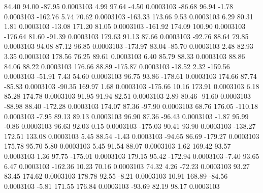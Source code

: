        84.40       94.00      -87.95     0.0003103
        4.99       97.64       -4.50     0.0003103
      -86.68       96.94       -1.78     0.0003103
     -162.76        5.74       70.62     0.0003103
     -163.33      173.66        9.53     0.0003103
        6.29       80.31        1.81     0.0003103
      -13.08      171.20       81.05     0.0003103
     -161.92      174.09      100.90     0.0003103
     -176.64       81.60      -91.39     0.0003103
      179.63       91.13       87.66     0.0003103
      -92.76       88.64       79.85     0.0003103
       94.08       87.12       96.85     0.0003103
     -173.97       83.04      -85.70     0.0003103
        2.48       82.93        3.35     0.0003103
      178.56       76.25       89.61     0.0003103
        6.40       85.79       88.33     0.0003103
       88.86       84.06       88.22     0.0003103
      176.66       88.89     -175.87     0.0003103
      -18.52        2.32     -159.56     0.0003103
      -51.91        7.43       54.60     0.0003103
       96.75       93.86     -178.61     0.0003103
      174.66       87.74      -85.83     0.0003103
      -90.35      169.97        1.68     0.0003103
     -175.66       10.16      173.91     0.0003103
        6.18       85.28      174.78     0.0003103
       91.95       91.94       82.51     0.0003103
        2.89       80.46      -91.60     0.0003103
      -88.98       88.40     -172.28     0.0003103
      174.07       87.36      -97.90     0.0003103
       68.76      176.05     -110.18     0.0003103
       -7.95       89.13       89.13     0.0003103
       96.90       87.36      -96.43     0.0003103
       -1.87       95.99       -0.86     0.0003103
       96.63       92.03        0.15     0.0003103
     -175.03       90.41       93.90     0.0003103
     -138.27      172.51      133.08     0.0003103
        5.45       88.54       -1.43     0.0003103
      -94.65       86.69     -179.27     0.0003103
      175.78       95.70        5.80     0.0003103
        5.45       91.54       88.07     0.0003103
        1.62      169.42       93.57     0.0003103
        1.36       97.75     -175.01     0.0003103
      179.15       95.42     -172.94     0.0003103
       -7.40       93.65        6.47     0.0003103
     -162.36       10.23       70.16     0.0003103
       74.32        4.26      -72.23     0.0003103
       93.27       83.45      174.62     0.0003103
      178.78       92.55       -8.21     0.0003103
       10.91      168.89      -84.56     0.0003103
       -5.81      171.55      176.84     0.0003103
      -93.69       82.19       98.17     0.0003103
